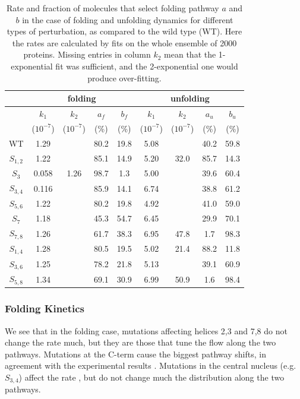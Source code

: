 \begin{table}
\centering
\begin{tabular}{c|cccc|cccc}
\hline\hline
&\multicolumn{4}{c|}{folding}&\multicolumn{4}{c}{unfolding}\\
\hline
& $k_1$ & $k_2$ & $a_f$ & $b_f$& $k_1$ & $k_2$ & $a_u$ & $b_u$\\
& ($10^{-7}$) &($10^{-7}$)& (\%) & (\%) &($10^{-7}$) &($10^{-7}$)& (\%) & (\%)\\
\hline
WT		&1.29	&	&80.2 	&19.8	&5.08	&	&40.2 &59.8	\\
$S_{1,2}$	&1.22	&	&85.1	&14.9	&5.20	&32.0	&85.7 &14.3	\\
$S_3$   	&0.058	&1.26	&98.7	&1.3	&5.00	&	&39.6 &60.4	\\
$S_{3,4}$	&0.116	&	&85.9	&14.1	&6.74	&	&38.8 &61.2	\\
$S_{5,6}$	&1.22	&	&80.2	&19.8	&4.92	&	&41.0 &59.0	\\
$S_7$		&1.18	&	&45.3	&54.7	&6.45	&	&29.9 &70.1	\\
$S_{7,8}$	&1.26	&	&61.7	&38.3	&6.95	&47.8	&1.7  &98.3	\\
$S_{1,4}$	&1.28	&	&80.5	&19.5	&5.02	&21.4	&88.2 &11.8	\\
$S_{3,6}$	&1.25	&	&78.2	&21.8	&5.13	&	&39.1 &60.9	\\
$S_{5,8}$	&1.34	&	&69.1	&30.9	&6.99	&50.9	&1.6  &98.4	\\
\hline\hline
\end{tabular}
\caption{\label{tab:pert} Rate and fraction of molecules that
select folding
pathway $a$ and $b$ in the case of folding and unfolding dynamics for different
types of perturbation, as compared to the wild type (WT). Here the rates are
calculated by fits on the whole ensemble of 2000 proteins. Missing entries in
column $k_2$ mean that the 1-exponential fit was sufficient, and the
2-exponential one  would produce over-fitting.}
\end{table}

\subsubsection{Folding Kinetics} 

We see that in the folding case, mutations affecting helices 2,3 and 7,8 do not
change the rate much, but they are those that tune the flow along the two
pathways. Mutations at the C-term cause the biggest pathway shifts, in agreement
with the experimental results  \cite{Lowe2007}.
Mutations in the central nucleus (e.g.  $S_{3,4}$) affect the rate , but do not
change much the distribution along the two pathways.

